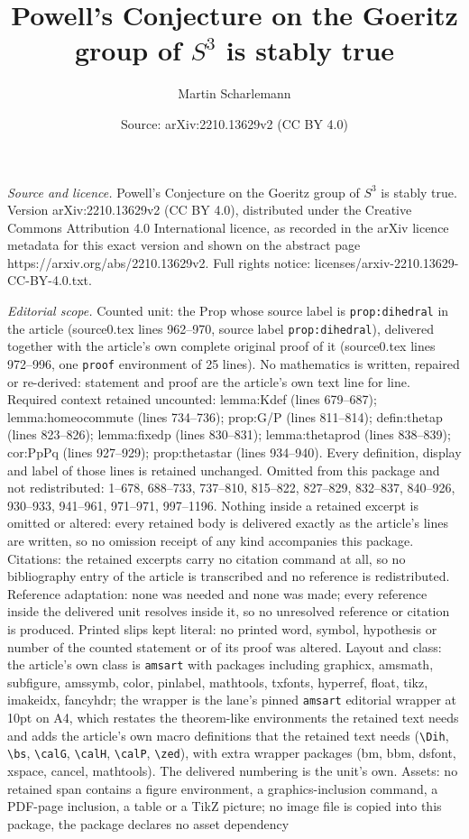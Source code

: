 \documentclass[10pt,a4paper]{amsart}
\title[Powell's Conjecture on the Goeritz group of $S^3$ is stably ]{Powell's Conjecture on the Goeritz group of $S^3$ is stably true}
\author{Martin Scharlemann}
\date{Source: arXiv:2210.13629v2 (CC BY 4.0)}
\begin{document}
\maketitle

\noindent\emph{Source and licence.} Powell's Conjecture on the Goeritz group of $S^3$ is stably true. Version arXiv:2210.13629v2 (CC BY 4.0), distributed under the Creative Commons Attribution 4.0 International licence, as recorded in the arXiv licence metadata for this exact version and shown on the abstract page https://arxiv.org/abs/2210.13629v2. Full rights notice: licenses/arxiv-2210.13629-CC-BY-4.0.txt.\par\smallskip

\noindent\textit{Editorial scope.} Counted unit: the Prop whose source label is \texttt{prop:dihedral} in the article (source0.tex lines 962--970, source label \texttt{prop:dihedral}), delivered together with the article's own complete original proof of it (source0.tex lines 972--996, one \texttt{proof} environment of 25 lines). No mathematics is written, repaired or re-derived: statement and proof are the article's own text line for line. Required context retained uncounted: lemma:Kdef (lines 679--687); lemma:homeocommute (lines 734--736); prop:G/P (lines 811--814); defin:thetap (lines 823--826); lemma:fixedp (lines 830--831); lemma:thetaprod (lines 838--839); cor:PpPq (lines 927--929); prop:thetastar (lines 934--940). Every definition, display and label of those lines is retained unchanged. Omitted from this package and not redistributed: 1--678, 688--733, 737--810, 815--822, 827--829, 832--837, 840--926, 930--933, 941--961, 971--971, 997--1196. Nothing inside a retained excerpt is omitted or altered: every retained body is delivered exactly as the article's lines are written, so no omission receipt of any kind accompanies this package. Citations: the retained excerpts carry no citation command at all, so no bibliography entry of the article is transcribed and no reference is redistributed. Reference adaptation: none was needed and none was made; every reference inside the delivered unit resolves inside it, so no unresolved reference or citation is produced. Printed slips kept literal: no printed word, symbol, hypothesis or number of the counted statement or of its proof was altered. Layout and class: the article's own class is \texttt{amsart} with packages including graphicx, amsmath, subfigure, amssymb, color, pinlabel, mathtools, txfonts, hyperref, float, tikz, imakeidx, fancyhdr; the wrapper is the lane's pinned \texttt{amsart} editorial wrapper at 10pt on A4, which restates the theorem-like environments the retained text needs and adds the article's own macro definitions that the retained text needs (\texttt{\textbackslash Dih}, \texttt{\textbackslash bs}, \texttt{\textbackslash calG}, \texttt{\textbackslash calH}, \texttt{\textbackslash calP}, \texttt{\textbackslash zed}), with extra wrapper packages (bm, bbm, dsfont, xspace, cancel, mathtools). The delivered numbering is the unit's own. Assets: no retained span contains a figure environment, a graphics-inclusion command, a PDF-page inclusion, a table or a TikZ picture; no image file is copied into this package, the package declares no asset dependency 
\end{document}

